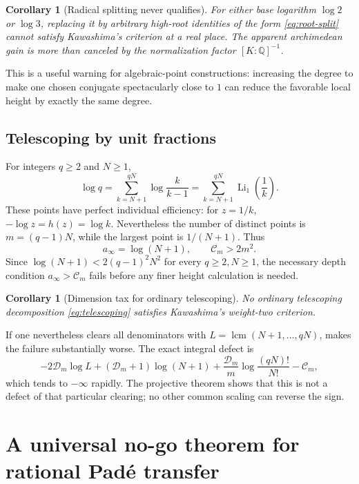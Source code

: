 \documentclass[11pt]{article}
\newtheorem{corollary}[theorem]{Corollary}
\theoremstyle{definition}
\newcommand{\Q}{\mathbb Q}
\newcommand{\Li}{\operatorname{Li}}
\newcommand{\D}{\mathcal D}
\newcommand{\Kc}{\mathcal C}
\begin{document}
\begin{corollary}[Radical splitting never qualifies]\label{cor:radical-no}
For either base logarithm $\log2$ or $\log3$, replacing it by arbitrary high-root identities
of the form \eqref{eq:root-split} cannot satisfy Kawashima's criterion at a real place.  The
apparent archimedean gain is more than canceled by the normalization factor $[K:\Q]^{-1}$.
\end{corollary}

This is a useful warning for algebraic-point constructions: increasing the degree to make one
chosen conjugate spectacularly close to $1$ can reduce the favorable local height by exactly
the same degree.

\subsection{Telescoping by unit fractions}

For integers $q\ge2$ and $N\ge1$,
\begin{equation}\label{eq:telescoping}
 \log q=\sum_{k=N+1}^{qN}\log\frac{k}{k-1}
       =\sum_{k=N+1}^{qN}\Li_1\!\left(\frac1k\right).
\end{equation}
These points have perfect individual efficiency: for $z=1/k$,
$-\log z=h(z)=\log k$.  Nevertheless the number of distinct points is
$m=(q-1)N$, while the largest point is $1/(N+1)$.  Thus
\[
  a_\infty=\log(N+1),\qquad
  \Kc_m>2m^2.
\]
Since $\log(N+1)<2(q-1)^2N^2$ for every $q\ge2,N\ge1$, the necessary depth condition
$a_\infty>\Kc_m$ fails before any finer height calculation is needed.

\begin{corollary}[Dimension tax for ordinary telescoping]\label{cor:telescoping-no}
No ordinary telescoping decomposition \eqref{eq:telescoping} satisfies Kawashima's
weight-two criterion.
\end{corollary}

If one nevertheless clears all denominators with
$L=\operatorname{lcm}(N+1,\ldots,qN)$,  makes the failure substantially
worse.  The exact integral defect is
\[
 -2\D_m\log L+(\D_m+1)\log(N+1)
 +\frac{\D_m}{m}\log\frac{(qN)!}{N!}-\Kc_m,
\]
which tends to $-\infty$ rapidly.  The projective theorem shows that this is not a defect of
that particular clearing; no other common scaling can reverse the sign.

\section{A universal no-go theorem for rational Pad\'e transfer}
\end{document}
